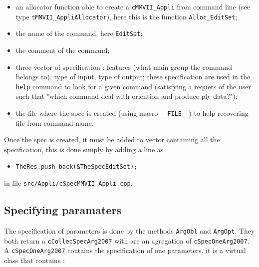 \begin{itemize}
   \item an allocator function able to create a {\tt cMMVII\_Appli} from command line
         (see type {\tt tMMVII\_AppliAllocator}), here this is the function {\tt Alloc\_EditSet};

   \item the name of the command, here {\tt EditSet};

   \item the comment of the command;

   \item three vector of specification : features (what main group the command belongs to), type
         of input, type of output;  these specification are used in the {\tt help} command to 
         look for a given command (satisfying a requets of the user such that "which command deal with oriention
         and produce ply data?");

   \item the file where the spec is created (using macro {\tt \_\_FILE\_\_}) to help recovering file from 
         command name.
\end{itemize}

Once the spec is created, it must be added to vector containing all the 
specification, this is done simply by adding a line as 
\begin{itemize}
   \item {\tt  TheRes.push\_back(\&TheSpecEditSet);} 
\end{itemize}

in file {\tt src/Appli/cSpecMMVII\_Appli.cpp}.



\subsection{Specifying paramaters}


The specification of parameters is done by the methods {\tt ArgObl} and {\tt ArgOpt}.
They both return a {\tt cCollecSpecArg2007} with are an agregation of {\tt cSpecOneArg2007}.
A {\tt cSpecOneArg2007} contains the specification of one parameters, it is
a virtual class that contains :

